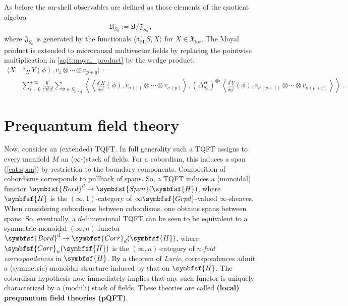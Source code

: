     As before the on-shell observables are defined as those elements of the quotient algebra
    \begin{gather}
        \mathfrak{U}_{S_0} := \mathfrak{U}/\mathfrak{J}_{S_0}\,,
    \end{gather}
    where $\mathfrak{J}_{S_0}$ is generated by the functionals $\langle\delta_{\text{EL}}S,X\rangle$ for $X\in\mathfrak{X}_{\text{loc}}$. The Moyal product is extended to microcausal multivector fields by replacing the pointwise multiplication in \cref{aqft:moyal_product} by the wedge product:
    \begin{align}
        \langle X\!&\ast_H\!Y(\phi),v_1\otimes\cdots\otimes v_{p+q} \rangle := \\
        &\sum_{i=0}^{+\infty}\frac{\hbar^i}{i!p!q!}\sum_{\sigma\in S_{p+q}}\left\langle\!\left\langle\frac{\delta^iX}{\delta\phi^i}(\phi),v_{\sigma(1)}\otimes\cdots\otimes v_{\sigma(p)}\right\rangle,(\Delta^H_{S_0})^{\otimes i}\left\langle\frac{\delta^iY}{\delta\phi^i}(\phi),v_{\sigma(p+1)}\otimes\cdots\otimes v_{\sigma(p+q)}\right\rangle\!\right\rangle\,.\nonumber
    \end{align}

\section{Prequantum field theory}

    Now, consider an (extended) TQFT. In full generality such a TQFT assigns to every manifold $M$ an ($\infty$-)stack of fields. For a cobordism, this induces a span (\cref{cat:span}) by restriction to the boundary components. Composition of cobordisms corresponds to pullback of spans. So, a TQFT induces a (monoidal) functor $\symbfsf{Bord}^d\rightarrow\symbfsf{Span}(\symbfsf{H})$, where $\symbfsf{H}$ is the $(\infty,1)$-category of $\infty\symbfsf{Grpd}$-valued $\infty$-sheaves. When considering cobordisms between cobordisms, one obtains spans between spans. So, eventually, a $d$-dimensional TQFT can be seen to be equivalent to a symmetric monoidal $(\infty,n)$-functor $\symbfsf{Bord}^d\rightarrow\symbfsf{Corr}_d(\symbfsf{H})$, where $\symbfsf{Corr}_n(\symbfsf{H})$ is the $(\infty,n)$-category of \textit{$n$-fold correspondences} in $\symbfsf{H}$. By a theorem of \textit{Lurie}, correspondences admit a (symmetric) monoidal structure induced by that on $\symbfsf{H}$. The cobordism hypothesis now immediately implies that any such functor is uniquely characterized by a (moduli) stack of fields. These theories are called \textbf{(local) prequantum field theories (pQFT)}.

